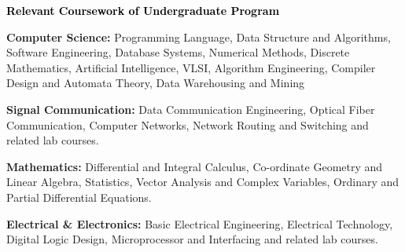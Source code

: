 \documentclass[a4paper]{article}
\begin{document}
    \textcolor{black}{\textbf{Relevant Coursework of Undergraduate Program}}\vspace{-0.6em}\\\noindent{\color{black} \rule{\linewidth}{0.1mm}}

    \noindent \textbf{Computer Science:} Programming Language, Data Structure and Algorithms, Software Engineering, Database Systems, Numerical Methods, Discrete Mathematics, Artificial Intelligence, VLSI, Algorithm Engineering, Compiler Design and Automata Theory,  Data Warehousing and Mining  

    \vspace{4pt}
    \noindent \textbf{Signal Communication:} Data Communication Engineering, Optical Fiber Communication, Computer Networks, Network Routing and Switching and related lab courses.

    \vspace{4pt}
    \noindent \textbf{Mathematics:} Differential and Integral Calculus, Co-ordinate Geometry and Linear Algebra, Statistics, Vector Analysis and Complex Variables, Ordinary and Partial Differential Equations.

    \vspace{4pt}
    \noindent \textbf{Electrical \& Electronics:} Basic Electrical Engineering, Electrical Technology, Digital Logic Design, Microprocessor and Interfacing and related lab courses.
   
\end{document}
